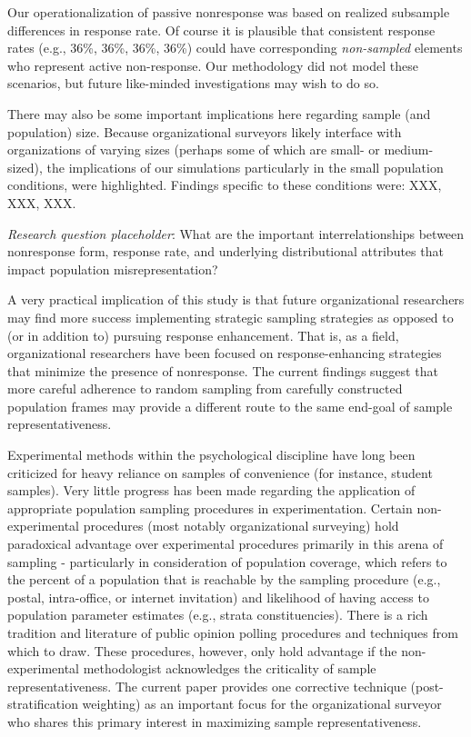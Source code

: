 \documentclass[
  man,mask]{apa7}
\begin{document}
Our operationalization of passive nonresponse was based on realized subsample differences in response rate. Of course it is plausible that consistent response rates (e.g., 36\%, 36\%, 36\%, 36\%) could have corresponding \emph{non-sampled} elements who represent active non-response. Our methodology did not model these scenarios, but future like-minded investigations may wish to do so.

There may also be some important implications here regarding sample (and population) size. Because organizational surveyors likely interface with organizations of varying sizes (perhaps some of which are small- or medium-sized), the implications of our simulations particularly in the small population conditions, were highlighted. Findings specific to these conditions were: XXX, XXX, XXX.

\emph{Research question placeholder}: What are the important interrelationships between nonresponse form, response rate, and underlying distributional attributes that impact population misrepresentation?

A very practical implication of this study is that future organizational researchers may find more success implementing strategic sampling strategies as opposed to (or in addition to) pursuing response enhancement. That is, as a field, organizational researchers have been focused on response-enhancing strategies that minimize the presence of nonresponse. The current findings suggest that more careful adherence to random sampling from carefully constructed population frames may provide a different route to the same end-goal of sample representativeness.

Experimental methods within the psychological discipline have long been criticized for heavy reliance on samples of convenience (for instance, student samples). Very little progress has been made regarding the application of appropriate population sampling procedures in experimentation. Certain non-experimental procedures (most notably organizational surveying) hold paradoxical advantage over experimental procedures primarily in this arena of sampling - particularly in consideration of population coverage, which refers to the percent of a population that is reachable by the sampling procedure (e.g., postal, intra-office, or internet invitation) and likelihood of having access to population parameter estimates (e.g., strata constituencies). There is a rich tradition and literature of public opinion polling procedures and techniques from which to draw. These procedures, however, only hold advantage if the non-experimental methodologist acknowledges the criticality of sample representativeness. The current paper provides one corrective technique (post-stratification weighting) as an important focus for the organizational surveyor who shares this primary interest in maximizing sample representativeness.
\end{document}
